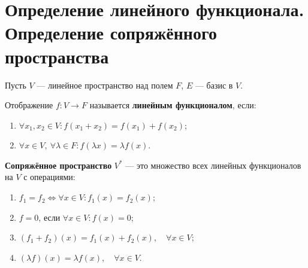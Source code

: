 \section{Определение линейного функционала. Определение сопряжённого пространства}

\begin{definition}
Пусть $V$ --- линейное пространство над полем $F$, $E$ --- базис в $V$.

Отображение $f: V \to F$ называется \textbf{линейным функционалом}, если:
\begin{enumerate}
    \item $\forall x_1, x_2 \in V: f(x_1 + x_2) = f(x_1) + f(x_2)$;
    \item $\forall x \in V,\ \forall \lambda \in F: f(\lambda x) = \lambda f(x)$.
\end{enumerate}
\end{definition}

\begin{definition}
\textbf{Сопряжённое пространство} $V^*$ --- это множество всех линейных функционалов на $V$ с операциями:
\begin{enumerate}
    \item $f_1 = f_2 \iff \forall x \in V: f_1(x) = f_2(x)$;
    \item $f = 0$, если $\forall x \in V: f(x) = 0$;
    \item $(f_1 + f_2)(x) = f_1(x) + f_2(x),\quad \forall x \in V$;
    \item $(\lambda f)(x) = \lambda f(x),\quad \forall x \in V$.
\end{enumerate}
\end{definition}
